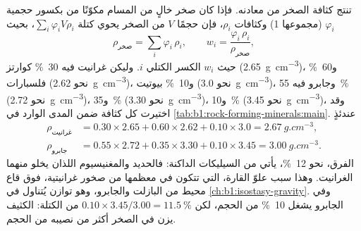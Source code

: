 تنتج كثافة الصخر من معادنه. فإذا كان صخر خالٍ من المسام مكوّنًا من  بكسور حجمية $\varphi_i$ (مجموعها 1) وكثافات $\rho_i$، فإن حجمًا $V$ من الصخر يحوي كتلة
$\sum_i \varphi_i V \rho_i$، بحيث
\[
  \rho_{\text{صخر}} = \sum_i \varphi_i\,\rho_i ,
  \qquad
  w_i = \frac{\varphi_i\,\rho_i}{\rho_{\text{صخر}}},
\]
حيث $w_i$ الكسر الكتلي  $i$. وليكن غرانيت فيه \qty{30}{\percent} كوارتز (\qty{2.65}{g.cm^{-3}})، و\qty{60}{\percent} فلسبارات (نحو \qty{2.62}{g.cm^{-3}})، و\qty{10}{\percent} بيوتيت (نحو \qty{3.0}{g.cm^{-3}})، وجابرو فيه \qty{55}{\percent}  (نحو \qty{2.72}{g.cm^{-3}})، و\qty{35}{\percent}  (نحو \qty{3.30}{g.cm^{-3}})، و\qty{10}{\percent}  (نحو \qty{3.45}{g.cm^{-3}})، وقد اختيرت كل كثافة ضمن المدى الوارد في \cref{tab:b1:rock-forming-minerals:main}. عندئذٍ
\begin{align*}
  \rho_{\text{غرانيت}} &= 0.30\times2.65 + 0.60\times2.62 + 0.10\times3.0
  = \qty{2.67}{g.cm^{-3}},\\
  \rho_{\text{جابرو}} &= 0.55\times2.72 + 0.35\times3.30 + 0.10\times3.45
  = \qty{3.00}{g.cm^{-3}}.
\end{align*}
الفرق، نحو \qty{12}{\percent}، يأتي من السيليكات الداكنة: فالحديد والمغنيسيوم اللذان يخلو منهما الغرانيت. وهذا سبب علوّ القارة، التي تتكون في معظمها من صخور غرانيتية، فوق قاع محيط من البازلت والجابرو، وهو توازن يُتناول في \cref{ch:b1:isostasy-gravity}. وفي الجابرو يشغل  \qty{10}{\percent} من الحجم، لكن $0.10\times3.45/3.00 = \qty{11.5}{\percent}$ من الكتلة:  الكثيف يزن في الصخر أكثر من نصيبه من الحجم.

